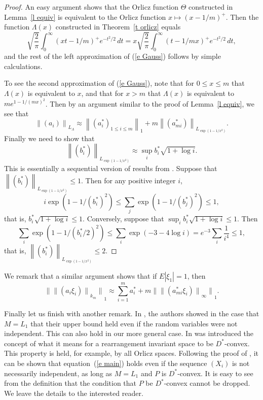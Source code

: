 \documentclass[12pt]{amsart}
\newcommand{\normo}[1]{{\left\|#1\right\|}}
\newcommand{\snormo}[1]{{\mathopen\|#1\mathclose\|}}
\begin{document}
\begin{proof}
An easy argument shows that the Orlicz function $\Theta$ constructed
in Lemma~\ref{l equiv} is equivalent to the 
Orlicz function $x \mapsto (x-1/m)^+$.  Then the function
$\Lambda(x)$ constructed in Theorem~\ref{t orlicz} equals
\[
\sqrt{\frac2\pi} \int_0^\infty (x t-1/m)^+ e^{-t^2/2} \, dt
=
x \sqrt{\frac2\pi} \int_0^\infty (t-1/mx)^+ e^{-t^2/2} \, dt ,
\]
and the rest of the left approximation of (\ref{e Gauss}) 
follows by simple calculations.

To see the second approximation of (\ref{e Gauss}), note that for 
$0 \le x \le m$ that
$\Lambda(x)$ is equivalent to $x$, and that for $x>m$ that $\Lambda(x)$
is equivalent to $m e^{1-1/(mx)^2}$.  Then 
by an argument similar to the
proof of Lemma~\ref{l equiv}, we see that 
\[ 
   \normo{(a_i)}_{L_\Lambda} \approx
   \normo{(a^*_i)_{1 \le i \le m}}_1
   +
   m \normo{(a^*_{m i})}_{L_{\exp(1-1/x^2)}} .
\]
Finally we need to show that
\[
   \normo{(b^*_{i})}_{L_{\exp(1-1/x^2)}} 
   \approx
   \sup_{i} b^*_{i} \sqrt{1+\log i} .
\]
This is essentially a sequential version of results from
\cite{bennett-rudnick}.  Suppose that 
$\normo{(b^*_{i})}_{L_{\exp(1-1/x^2)}} \le 1$.  Then for any positive integer 
$i$,
\[
   i \exp(1-1/(b^*_i)^2) \le \sum_j \exp(1-1/(b^*_j)^2) \le 1,
\]
that is, $b^*_{i} \sqrt{1+\log i} \le 1$.  Conversely, 
suppose that $\sup_i b^*_i \sqrt{1+\log i} \le 1$.  Then
\[
   \sum_i \exp(1-1/(b^*_i/2)^2)
   \le
   \sum_i \exp(-3-4\log i)
   = 
   e^{-3} \sum_i \frac1{i^4} \le 1,
\]
that is, $\normo{(b^*_{i})}_{L_{\exp(1-1/x^2)}} \le 2$.
\end{proof}

We remark that a similar argument shows that
if $E|\xi_1| = 1$, then
\[
   \snormo{\snormo{(a_i \xi_i)}_{k_m}}_1 
   \approx \sum_{i=1}^m a^*_i  + 
    m \snormo{\snormo{(a^*_{m i} \xi_i)}_\infty}_1 .
\]
\bigskip

Finally let us finish with another remark.  In \cite{gordon et al}, the authors
showed in the case that $M = L_1$
that their upper bound held even if the random variables were
not independent.  This can also hold in our more general case.
In \cite{montgomery-smith-semenov} was introduced the concept of what
it means for a rearrangement invariant space to be $D^*$-convex.
This property is held, for example, by all Orlicz spaces.
Following the proof of \cite[Theorem 27]{montgomery-smith-semenov},
it can be shown that equation~(\ref{e main}) holds even if the
sequence $(X_i)$ is not necessarily independent, as long as 
$M = L_1$ and $P$ is $D^*$-convex.  
It is easy to see from the definition that the condition that
$P$ be $D^*$-convex cannot be dropped.
We leave the details to the
interested reader.
\end{document}
